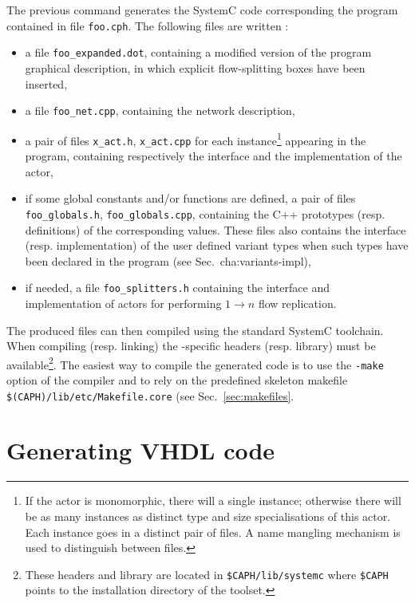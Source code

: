 The previous command generates the SystemC code corresponding the program contained in file
\texttt{foo.cph}. The following files are written :
\begin{itemize}
\item a file \texttt{foo\_expanded.dot}, containing a modified version of the program graphical
  description,  in which explicit flow-splitting boxes have been inserted,
\item a file \texttt{foo\_net.cpp}, containing the network description,
\item a pair of files \texttt{x\_act.h}, \texttt{x\_act.cpp} for each instance\footnote{If the actor
    is monomorphic, there will a single instance; otherwise there will be as many instances as
    distinct type and size specialisations of this actor. Each instance goes in a distinct pair of
    files. A name mangling mechanism is used to distinguish between files.}
  appearing in the program, containing respectively the interface and the implementation of the
  actor,
\item if some global constants and/or functions are defined, a pair of files \texttt{foo\_globals.h},
  \texttt{foo\_globals.cpp}, containing the C++ prototypes (resp. definitions) of the corresponding
  values. These files also contains the interface (resp. implementation) of the user defined variant
  types when such types have been declared in the program (see Sec.~{cha:variants-impl}),
\item if needed, a file \verb|foo_splitters.h| containing the interface and implementation of
  actors for performing $1 \rightarrow n$ flow replication.
\end{itemize}

The produced files can then compiled using the standard SystemC toolchain. When compiling
(resp. linking) the \caph-specific headers (resp. library) must be available\footnote{These headers
  and library are located in \texttt{\${CAPH}/lib/systemc} where \texttt{\${CAPH}} points to the
  installation directory of the \caph toolset.}. The easiest way to compile the generated code is to
use the \verb|-make| option of the compiler and to rely on the predefined skeleton makefile
\verb|$(CAPH)/lib/etc/Makefile.core| (see Sec.~\ref{sec:makefiles}.

\section{Generating VHDL code}
\label{sec:generating-vhdl-code}

